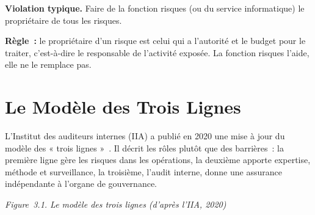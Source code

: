 \begin{boxalert}
\textbf{Violation typique.} Faire de la fonction risques (ou du service
informatique) le propriétaire de tous les risques.

\smallskip
\textbf{Règle~:} le propriétaire d'un risque est celui qui a l'autorité et
le budget pour le traiter, c'est-à-dire le responsable de l'activité
exposée. La fonction risques l'aide, elle ne le remplace pas.
\end{boxalert}

\section{Le Modèle des Trois Lignes}
\label{sec:c03-lignes}

L'Institut des auditeurs internes (IIA) a publié en 2020 une mise à jour
du modèle des « trois lignes »~\cite{iia2020troislignes}. Il décrit les rôles
plutôt que des barrières~: la première ligne gère les risques dans les
opérations, la deuxième apporte expertise, méthode et surveillance, la
troisième, l'audit interne, donne une assurance indépendante à l'organe de
gouvernance.

\begin{center}
\end{center}
\vspace{-0.4em}
\begin{center}{\small\itshape Figure~3.1. Le modèle des trois lignes (d'après l'IIA, 2020)}\end{center}

